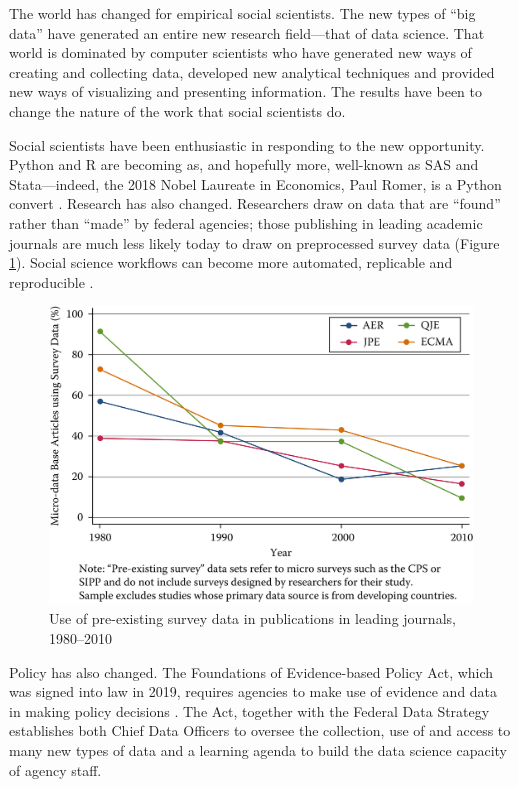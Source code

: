 \documentclass[]{krantz}
\begin{document}
The world has changed for empirical social scientists. The new types of
``big data'' have generated an entire new research field---that of data
science. That world is dominated by computer scientists who have
generated new ways of creating and collecting data, developed new
analytical techniques and provided new ways of visualizing and
presenting information. The results have been to change the nature of
the work that social scientists do.

Social scientists have been enthusiastic in responding to the new
opportunity. Python and R are becoming as, and hopefully more,
well-known as SAS and Stata---indeed, the 2018 Nobel Laureate in
Economics, Paul Romer, is a Python convert \citep{Kopf}. Research has
also changed. Researchers draw on data that are ``found'' rather than
``made'' by federal agencies; those publishing in leading academic
journals are much less likely today to draw on preprocessed survey data
(Figure \ref{fig:fig1}). Social science workflows can become more
automated, replicable and reproducible \citep{Yarkoni2019}.

\begin{figure}

{\centering \includegraphics[width=0.7\linewidth]{ChapterIntro/figures/Figure1} 

}

\caption{Use of pre-existing survey data in publications in leading journals, 1980--2010 \citep{Chetty2012}}\label{fig:fig1}
\end{figure}

Policy has also changed. The Foundations of Evidence-based Policy Act,
which was signed into law in 2019, requires agencies to make use of
evidence and data in making policy decisions \citep{Hart}. The Act,
together with the Federal Data Strategy
\citep{OfficeofManagementandBudget} establishes both Chief Data Officers
to oversee the collection, use of and access to many new types of data
and a learning agenda to build the data science capacity of agency
staff.
\end{document}

